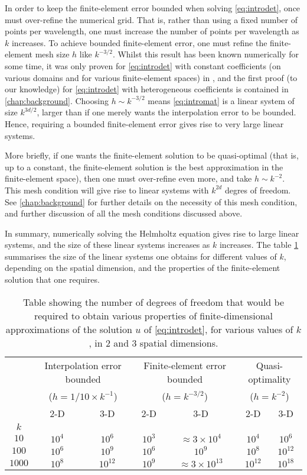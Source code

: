 In order to keep the finite-element error bounded when solving \eqref{eq:introdet}, once must over-refine the numerical grid. That is, rather than using a fixed number of points per wavelength, one must increase the number of points per wavelength as $k$ increases. To achieve bounded finite-element error, one must refine the finite-element mesh size $h$ like $k^{-3/2}$. Whilst this result has been known numerically for some time, it was only proven for \eqref{eq:introdet} with constant coefficients (on various domains and for various finite-element spaces) in \cite{IhBa:95a,Wu:14,DuWu:15,ChNi:18}, and the first proof (to our knowledge) for \eqref{eq:introdet} with heterogeneous coefficients  is contained in \cref{chap:background}. Choosing $h \sim k^{-3/2}$ means \eqref{eq:intromat} is a linear system of size $k^{3d/2}$, larger than if one merely wants the interpolation error to be bounded. Hence, requiring a bounded finite-element error gives rise to very large linear systems.

More briefly, if one wants the finite-element solution to be quasi-optimal (that is, up to a constant, the finite-element solution is the best approximation in the finite-element space), then one must over-refine even more, and take $h \sim k^{-2}$. This mesh condition will give rise to linear systems with $k^{2d}$ degres of freedom. See \cref{chap:background} for further details on the necessity of this mesh condition, and further discussion of all the mesh conditions discussed above.

In summary, numerically solving the Helmholtz equation gives rise to large linear systems, and the size of these linear systems increases as $k$ increases. The table \cref{tab:introlinsys} summarises the size of the linear systems one obtains for different values of $k$, depending on the spatial dimension, and the properties of the finite-element solution that one requires.
\begin{table}
\begin{tabular}{c|cccccc}
  &\multicolumn{2}{c}{Interpolation error bounded}&\multicolumn{2}{c}{Finite-element error bounded}&\multicolumn{2}{c}{Quasi-optimality}\\
    &\multicolumn{2}{c}{($h = 1/10 \times k^{-1}$)}&\multicolumn{2}{c}{($h = k^{-3/2}$)}&\multicolumn{2}{c}{($h = k^{-2}$)}\\
&2-D&3-D&2-D&3-D&2-D&3-D\\
\hline
$k$&&&&&&\\
$10$&$10^4$&$10^6$&$10^3$&$\approx 3 \times 10^4$&$10^4$&$10^6$\\
$100$&$10^6$&$10^9$&$10^6$&$10^9$&$10^8$&$10^{12}$\\
$1000$&$10^8$&$10^{12}$&$10^9$&$\approx 3 \times 10^{13}$&$10^{12}$&$10^{18}$
\end{tabular}
\caption{\label{tab:introlinsys}Table showing the number of degrees of freedom that would be required to obtain various properties of finite-dimensional approximations of the solution $u$ of \eqref{eq:introdet}, for various values of $k$, in 2 and 3 spatial dimensions.}
\end{table}

